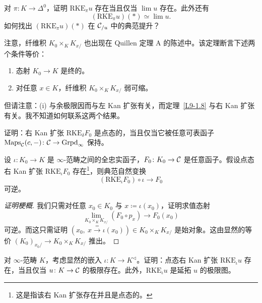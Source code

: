 \begin{exercise}\label{L9-1.13}
对 $\pi\colon K\to\Delta^0$，证明 $\mathrm{RKE}_\pi u$ 存在当且仅当 $\lim u$ 存在。此外还有
\[
(\mathrm{RKE}_\pi u)(\ast)\simeq\lim u.
\]
如何找出 $(\mathrm{RKE}_\pi u)(\ast)$ 在 $\mathcal{C}_{/u}$ 中的典范提升？
\end{exercise}

\begin{warning}\label{L9-1.14}
注意，纤维积 $K_0\times_K K_{x/}$ 也出现在 Quillen 定理 A 的陈述中。该定理断言下述两个条件等价：
\begin{enumerate}[label=(\roman*),leftmargin=2.6em,itemsep=0.1em]
\item 态射 $K_0\to K$ 是终的。
\item 对任意 $x\in K$，纤维积 $K_0\times_K K_{x/}$ 弱可缩。
\end{enumerate}
但请注意：(i) 与余极限因而与左 Kan 扩张有关，而定理~\ref{L9-1.8} 与右 Kan 扩张有关。我不知道如何联系这两个结果。
\end{warning}

\begin{exercise}\label{L9-1.15}
证明：右 Kan 扩张 $\mathrm{RKE}_\delta F_0$ 是点态的，当且仅当它被任意可表函子 $\operatorname{Maps}_{\mathcal{C}}(c,-)\colon\mathcal{C}\to\operatorname{Grpd}_\infty$ 保持。
\end{exercise}

\begin{proposition}\label{L9-1.16}
设 $\iota\colon K_0\to K$ 是 $\infty$-范畴之间的全忠实函子，$F_0\colon K_0\to\mathcal{C}$ 是任意函子。假设点态右 Kan 扩张 $\mathrm{RKE}_\iota F_0$ 存在\footnote{这是指该右 Kan 扩张存在并且是点态的。}，则典范自然变换
\[
(\mathrm{RKE}_\iota F_0)\circ\iota\to F_0
\]
可逆。
\end{proposition}

\begin{proof}[证明梗概]
我们只需对任意 $x_0\in K_0$ 与 $x\coloneqq\iota(x_0)$，证明求值态射
\[
\lim_{K_0\times_K K_{x/}}(F_0\circ p_x)\to F_0(x_0)
\]
可逆。而这只需证明 $(x_0,\ x\xrightarrow{=}\iota(x_0))\in K_0\times_K K_{x/}$ 是始对象。这由显然的等价 $(K_0)_{x_0/}\to K_0\times_K K_{x/}$ 推出。
\end{proof}

\begin{exercise}\label{L9-1.17}
对 $\infty$-范畴 $K$，考虑显然的嵌入 $\iota\colon K\to K^{\triangleleft}$。证明：点态右 Kan 扩张 $\mathrm{RKE}_\iota u$ 存在，当且仅当 $u\colon K\to\mathcal{C}$ 的极限存在。此外，$\mathrm{RKE}_\iota u$ 是延拓 $u$ 的极限图。
\end{exercise}

